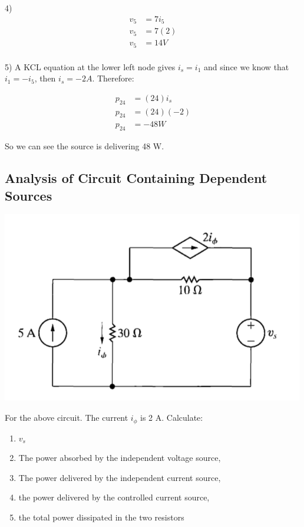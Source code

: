 4)
\begin{align*}
	v_5 &= 7i_5 \\
	v_5 &= 7(2) \\
	v_5 &= 14 V \\
\end{align*}

5) A KCL equation at the lower left node gives $i_s = i_1$ and since we know that $i_1 = -i_5$, then
$i_s = -2A$. Therefore:

\begin{align*}
	p_24 &= (24)i_s \\
	p_24 &= (24)(-2) \\
	p_24 &= -48 W
\end{align*}
 
So we can see the source is delivering 48 W. 

\newpage
\subsection{Analysis of Circuit Containing Dependent Sources}
\includegraphics[scale=0.25]{img/c2/p4}

For the above circuit. The current $i_{\phi}$ is 2 A. Calculate:
\begin{enumerate}
	\item $v_s$
	\item The power absorbed by the independent voltage source,
	\item The power delivered by the independent current source,
	\item the power delivered by the controlled current source,
	\item the total power dissipated in the two resistors
\end{enumerate}

